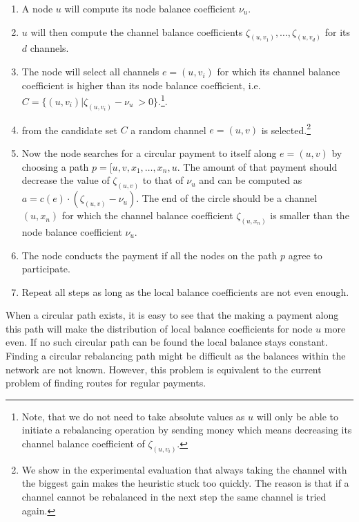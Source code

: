 \documentclass[a4paper]{paper}
\begin{document}
\begin{enumerate}
\item A node $u$ will compute its node balance coefficient $\nu_u$.
\item $u$ will then compute the channel balance coefficients $\zeta_{(u,v_1)},\dots,\zeta_{(u,v_d)}$ for its $d$ channels.
\item The node will select all channels $e=(u,v_i)$ for which its channel balance coefficient is higher 
than its node balance coefficient, i.e.~$C = \{(u,v_i) | \zeta_{(u,v_i)} - \nu_u\ > 0\}$.\footnote{
  Note, that we do not need to take absolute values as $u$ will only be able to initiate a rebalancing operation by sending money which means decreasing its channel balance coefficient of $\zeta_{(u,v_i)}$.}.
\item from the candidate set $C$ a random channel $e=(u,v)$ is selected.\footnote{
  We show in the experimental evaluation that always taking the channel with the biggest gain makes the heuristic stuck too quickly. 
  The reason is that if a channel cannot be rebalanced in the next step the same channel is tried again.} 
\item Now the node searches for a circular payment to itself along $e=(u,v)$ by choosing a path $p = [u,v,x_1,\dots,x_n,u$. The amount of that payment should decrease the value of $\zeta_{(u,v)}$ to that of $\nu_u$ and can be computed as $a = c(e)\cdot (\zeta_{(u,v)}-\nu_u)$. The end of the circle should be a channel $(u,x_n)$ for which the channel balance coefficient $\zeta_{(u,x_n)}$ is smaller than the node balance coefficient $\nu_u$.
\item The node conducts the payment if all the nodes on the path $p$ agree to participate. 
\item Repeat all steps as long as the local balance coefficients are not even enough.
\end{enumerate}

When a circular path exists, it is easy to see that the making a payment along this path will make the distribution of local balance coefficients for node $u$ more even.
If no such circular path can be found the local balance stays constant.
Finding a circular rebalancing path might be difficult as the balances within the network are not known. 
However, this problem is equivalent to the current problem of finding routes for regular payments.
\end{document}
